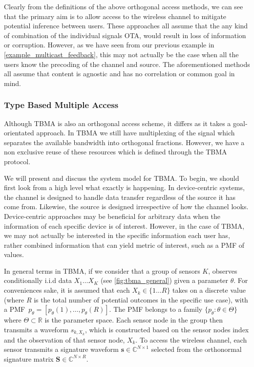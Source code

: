 \documentclass{article}
\begin{document}
Clearly from the definitions of the above orthogonal access methods, we can see that the primary aim is to allow access to the wireless channel to mitigate potential inference between users. These approaches all assume that the any kind of combination of the individual signals \ac{OTA}, would result in loss of information or corruption. However, as we have seen from our previous example in \cref{example_multicast_feedback}, this may not actually be the case when all the users know the precoding of the channel and source. The aforementioned methods all assume that content is agnostic and has no correlation or common goal in mind. 

\subsubsection{Type Based Multiple Access}

Although \ac{TBMA} is also an orthogonal access scheme, it differs as it takes a goal-orientated approach. In \ac{TBMA} we still have multiplexing of the signal which separates the available bandwidth into orthogonal fractions. However, we have a non exclusive reuse of these resources which is defined through the TBMA protocol. 

We will present and discuss the system model for TBMA. To begin, we should first look from a high level what exactly is happening. In device-centric systems, the channel is designed to handle data transfer regardless of the source it has come from. Likewise, the source is designed irrespective of how the channel looks. Device-centric approaches may be beneficial for arbitrary data when the information of each specific device is of interest. However, in the case of TBMA, we may not actually be interested in the specific information each user has, rather combined information that can yield metric of interest, such as a \ac{PMF} of values. 

In general terms in TBMA, if we consider that a group of sensors $K$, observes conditionally \ac{i.i.d} data $X_1 \dots X_K $ (see \cref{fig:tbma_general}) given a parameter $\theta$. For conveniences sake, it is assumed that each $X_k \in \{1 \dots R\}$ takes on a discrete value (where $R$ is the total number of potential outcomes in the specific use case), with a \ac{PMF}~${p_{\theta} = [p_{\theta}(1), \ldots, p_{\theta}(R)]}$. The \ac{PMF} belongs to a family $\{p_{\theta}: \theta \in \Theta\}$ where $\Theta \subset \mathbb{R}$ is the parameter space. Each sensor node in the group then transmits a waveform $s_{k,X_k}$, which is constructed based on the sensor nodes index and the observation of that sensor node, $X_k$. To access the wireless channel, each sensor transmits a signature waveform $\boldsymbol{s} \in \mathbb{C}^{N \times 1}$ selected from the orthonormal signature matrix $\boldsymbol{S} \in \mathbb{C}^{N \times R}$.
\end{document}
